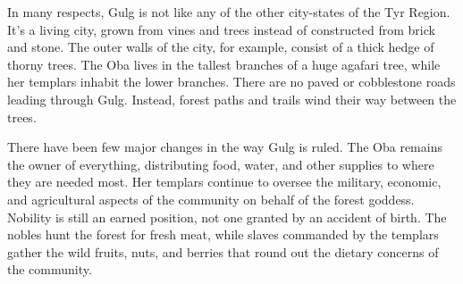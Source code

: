 {

	In many respects, Gulg is not like any of the other city-states of the Tyr Region. It's a living city, grown from vines and trees instead of constructed from brick and stone. The outer walls of the city, for example, consist of a thick hedge of thorny trees. The Oba lives in the tallest branches of a huge agafari tree, while her templars inhabit the lower branches. There are no paved or cobblestone roads leading through Gulg. Instead, forest paths and trails wind their way between the trees.

	There have been few major changes in the way Gulg is ruled. The Oba remains the owner of everything, distributing food, water, and other supplies to where they are needed most. Her templars continue to oversee the military, economic, and agricultural aspects of the community on behalf of the forest goddess. Nobility is still an earned position, not one granted by an accident of birth. The nobles hunt the forest for fresh meat, while slaves commanded by the templars gather the wild fruits, nuts, and berries that round out the dietary concerns of the community.
}
